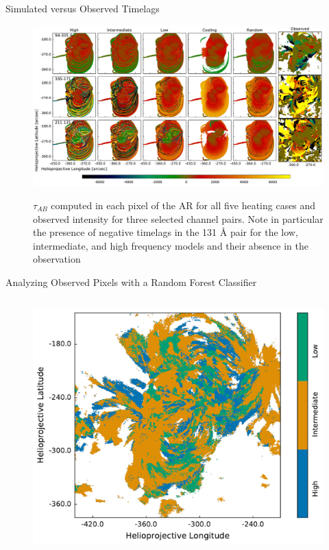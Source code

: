 \documentclass[final,12pt]{beamer}
\begin{document}
\begin{frame}
\begin{columns}[T]
\begin{column}{0.49\linewidth}
\begin{block}{Simulated versus Observed Timelags}
      \vspace{-2ex}
      \begin{figure}
        \includegraphics{../figures/timelag_maps}
        \label{fig:timelag_maps}
        \caption{$\tau_{AB}$ computed in each pixel of the AR for all five heating cases and observed intensity for three selected channel pairs. Note in particular the presence of negative timelags in the 131 \AA\,\,pair for the low, intermediate, and high frequency models and their absence in the observation}
      \end{figure}
    \end{block}
    \begin{block}{Analyzing Observed Pixels with a Random Forest Classifier}
      \begin{columns}[c]
        \begin{column}{0.35\columnwidth}
          \begin{figure}
            \includegraphics{../figures/class_map}

\end{figure}
\end{column}
\end{columns}
\end{block}
\end{column}
\end{columns}
\end{frame}
\end{document}
